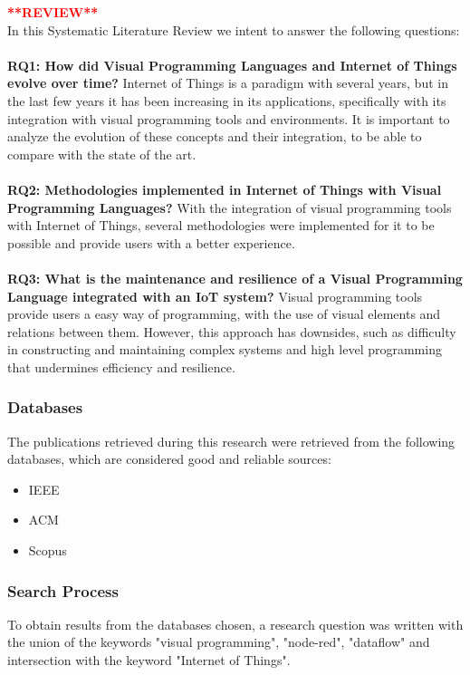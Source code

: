 \textcolor{red}{\textbf{**REVIEW**}}\\
In this Systematic Literature Review we intent to answer the following questions:
\\ \\
\textbf{RQ1: How did Visual Programming Languages and Internet of Things evolve over time?} Internet of Things is a paradigm with several years, but in the last few years it has been increasing in its applications, specifically with its integration with visual programming tools and environments. It is important to analyze the evolution of these concepts and their integration, to be able to compare with the state of the art.\\ \\
\textbf{RQ2: Methodologies implemented in Internet of Things with Visual Programming Languages?} With the integration of visual programming tools with Internet of Things, several methodologies were implemented for it to be possible and provide users with a better experience.\\ \\
\textbf{RQ3: What is the maintenance and resilience of a Visual Programming Language integrated with an IoT system?} Visual programming tools provide users a easy way of programming, with the use of visual elements and relations between them. However, this approach has downsides, such as difficulty in constructing and maintaining complex systems and high level programming that undermines efficiency and resilience.


\subsubsection{Databases}\label{sec:databases}

The publications retrieved during this research were retrieved from the following databases, which are considered good and reliable sources:

\begin{itemize}
    \item IEEE
    \item ACM
    \item Scopus
\end{itemize}{}

\subsubsection{Search Process}\label{sec:process}

To obtain results from the databases chosen, a research question was written with the union of the keywords "visual programming", "node-red", "dataflow" and intersection with the keyword "Internet of Things".

